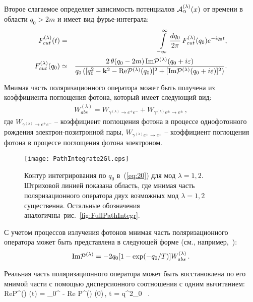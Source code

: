 Второе слагаемое определяет зависимость потенциалов ${\cal A}^{(\lambda)}_\alpha(x)$ от времени
в области $q_0>2m$ и имеет вид
фурье-интеграла:
%
\begin{eqnarray}
F^{(\lambda)}_{cut}(t) &=& \int \limits_{- \infty}^{\infty} \frac{dq_0}{2 \pi}\,
F^{(\lambda)}_{cut}(q_0)e^{- i q_0 t},
\label{eq:20} 
\\
F^{(\lambda)}_{cut}(q_0) &\simeq& 
\frac{2 \,\theta (q_0  -  2 m)\,\text{Im}{\cal 
		P}^{(\lambda)}(q_0 + i \varepsilon)}
{q_0\,([ q_0^2 - {\bf k}^2 - \text{Re} {\cal P}^{(\lambda)}(q_0)]^2 + 
[\text{Im}{\cal 
P}^{(\lambda)}(q_0 + i \varepsilon)]^2)}.
\label{eq:21}
\end{eqnarray}

Мнимая часть поляризационного оператора может быть получена из коэффициента  
поглощения фотона, который имеет следующий вид:
\begin{eqnarray}
W^{(\lambda)}_{abs} = W_{\gamma^{(\lambda)} \to e^+ e^-} + 
W_{\gamma^{(\lambda)} e^{\pm} \to e^{\pm}} \, ,
\label{eq:Wabs}
\end{eqnarray}
где $W_{\gamma^{(\lambda)} \to e^+ e^-}$ -- коэффициент поглощения фотона в процессе однофотонного рождения электрон-позитронной пары, $W_{\gamma^{(\lambda)} e^{\pm} \to e^{\pm}}$ -- коэффициент поглощения фотона в процессе поглощения фотона электроном.

\begin{figure}[t]\centering
	\texttt{[image: PathIntegrate2Gl.eps]}
	\caption{Контур интегрирования по $q_0$ в~(\ref{eq:20}) для мод $\lambda = 1,2$. Штриховой линией показана область, где мнимая часть поляризационного оператора двух возможных мод $\lambda = 1,2$ существенна. Остальные обозначения аналогичны~рис.~\ref{fig:FullPathIntegr}.}\label{fig:PathIntegr}
\end{figure}

С учетом процессов излучения фотонов мнимая часть поляризационного оператора 
может быть представлена в 
следующей форме (см., например,~\cite{Shabad:1988, 
Rumyantsev:2017,Weldon:1983}): 
\begin{eqnarray}\label{eq:Ilambda}
\text{Im} {\cal P}^{(\lambda)} =  -2 q_0 [1-\exp (-q_0/T)] W^{(\lambda)}_{abs} 
\, . 
\label{eq:ImP}
\end{eqnarray}

Реальная часть 
поляризационного оператора может быть восстановлена по его мнимой части с помощью дисперсионного соотношения с одним 
вычитанием:
%
\beq 
\textrm{Re}{\cal P}^{(\lambda)} (t) = \int \limits_0^\infty 
{} - \textrm{Re}{\cal 
P}^{(\lambda)} (0)\,, \qquad  t = q^2_0 \, .
\label{eq:Disp}
\eeq

